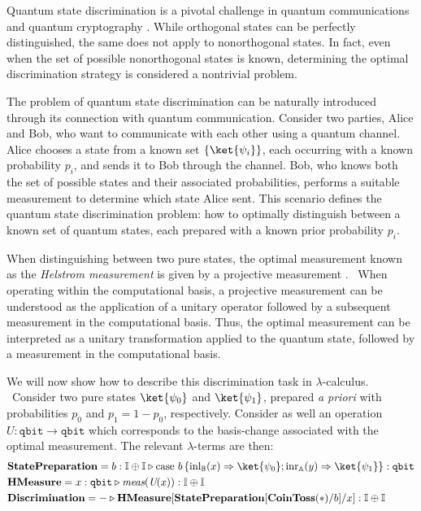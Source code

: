 \begin{example} \label{ex:quantum_state_discrimination_syntax}
Quantum state discrimination is a pivotal challenge in 
 quantum communications \cite{barnett2009qinfo,watrous2018theory} and quantum cryptography \cite{Gisin02qcripto}. 
While orthogonal states can be perfectly distinguished, the same does not apply
to nonorthogonal states. In fact, even when the set of possible nonorthogonal
states is known, determining the optimal discrimination strategy is considered
a nontrivial problem.

The problem of quantum state discrimination can be naturally introduced through its connection with quantum communication. Consider two parties, Alice and Bob, who want to communicate with each other using a quantum channel. Alice chooses a state from a known set $\{\ket{\psi_i}\}$, each occurring with a known probability $p_i$, and sends it to Bob through the channel. Bob, who knows both the set of possible states and their associated probabilities, performs a suitable measurement to determine which state Alice sent. This scenario defines the quantum state discrimination problem: how to optimally distinguish between a known set of quantum states, each prepared with a known prior probability $p_i$.

When distinguishing between two pure states, the optimal measurement known as the \emph{Helstrom measurement} is given by a projective measurement
\cite{barnett2009qinfo}.  When operating within the computational basis, a
projective measurement can be understood as the application of a unitary
operator followed by a subsequent measurement in the computational basis. Thus,
the optimal measurement can be interpreted as a unitary transformation applied
to the quantum state, followed by a measurement in the computational basis. 

We will now show how to describe this discrimination task in
$\lambda$-calculus.  Consider two pure states $\ket{\psi_0}$ and
$\ket{\psi_1}$, prepared \emph{a priori} with probabilities $p_0$ and $p_1 = 1-p_0$,
respectively. Consider as well an operation $U : \mathtt{qbit} \to \mathtt{qbit}$ which
corresponds to the basis-change associated with the optimal measurement.
The relevant $\lambda$-terms are then:
\begin{align*}
  &\textbf{StatePreparation} =  b: \typeI \oplus \typeI  \vljud  \text{case } b\,
  \{\inl_{\typeB}(x) \Rightarrow \ket{\psi_0} ; \inr_{\typeA}(y) \Rightarrow \ket{\psi_1}\}: \mathtt{qbit} \\
  &\textbf{HMeasure} =  x : \mathtt{qbit} \vljud \emph{meas} (\emph{U}(x)): \typeI \oplus \typeI \\
  &\textbf{Discrimination} = - \vljud \textbf{HMeasure} [ \textbf{StatePreparation} [\textbf{CoinToss}(*)/ b] / x] : \typeI\oplus \typeI
\end{align*}


\end{example}
